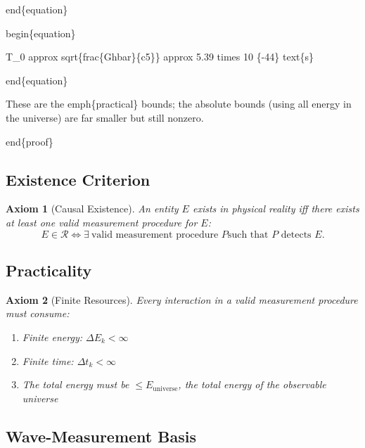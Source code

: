 \documentclass[aps,preprint,showpacs,showkeys]{revtex4}%
\newtheorem{axiom}{Axiom}
\begin{document}
\TEXTsymbol{\backslash}end\{equation\}

\TEXTsymbol{\backslash}begin\{equation\}

T\_0 \TEXTsymbol{\backslash}approx \TEXTsymbol{\backslash}sqrt\{\TEXTsymbol{%
\backslash}frac\{G\TEXTsymbol{\backslash}hbar\}\{c5\}\} 
\TEXTsymbol{\backslash}approx 5.39 \TEXTsymbol{\backslash}times 10%
\{-44\}\TEXTsymbol{\backslash} \TEXTsymbol{\backslash}text\{s\}

\TEXTsymbol{\backslash}end\{equation\}

These are the \TEXTsymbol{\backslash}emph\{practical\} bounds; the absolute
bounds (using all energy in the universe) are far smaller but still nonzero.

\TEXTsymbol{\backslash}end\{proof\}

\subsection{Existence Criterion}

\begin{axiom}[Causal Existence]
An entity $E$ exists in physical reality iff there exists at least one valid
measurement procedure for $E$: 
\begin{equation}
E \in \mathcal{R} \iff \exists\ \text{valid measurement procedure } P \text{
such that } P \text{ detects } E.
\end{equation}
\end{axiom}

\subsection{Practicality}

\begin{axiom}[Finite Resources]
Every interaction in a valid measurement procedure must consume:

\begin{enumerate}
\item Finite energy: $\Delta E_k < \infty$

\item Finite time: $\Delta t_k < \infty$

\item The total energy must be $\le E_{\text{universe}}$, the total energy
of the observable universe
\end{enumerate}
\end{axiom}

\subsection{Wave-Measurement Basis}
\end{document}
